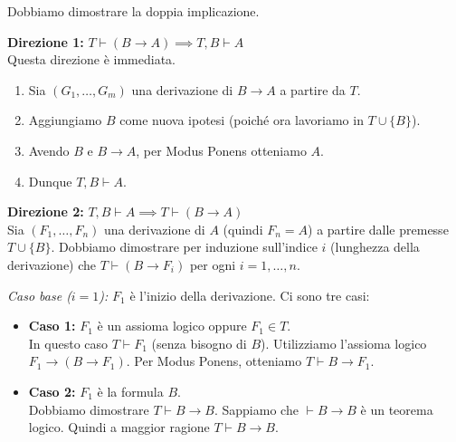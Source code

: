 \documentclass[a4paper,11pt]{report}
\begin{document}
\begin{proofframe}[title=dim]
    Dobbiamo dimostrare la doppia implicazione.

    \textbf{Direzione 1:} \( T \vdash (B \to A) \implies T, B \vdash A \) \\
    Questa direzione è immediata.
    \begin{enumerate}
        \item Sia \( (G_1, \dots, G_m) \) una derivazione di \( B \to A \) a partire da \( T \).
        \item Aggiungiamo \( B \) come nuova ipotesi (poiché ora lavoriamo in \( T \cup \{B\} \)).
        \item Avendo \( B \) e \( B \to A \), per Modus Ponens otteniamo \( A \).
        \item Dunque \( T, B \vdash A \).
    \end{enumerate}

    \textbf{Direzione 2:} \( T, B \vdash A \implies T \vdash (B \to A) \) \\
    Sia \( (F_1, \dots, F_n) \) una derivazione di \( A \) (quindi \( F_n = A \)) a partire dalle premesse \( T \cup \{B\} \).
    Dobbiamo dimostrare per induzione sull'indice \( i \) (lunghezza della derivazione) che \( T \vdash (B \to F_i) \) per ogni \( i = 1, \dots, n \).

    \textit{Caso base (\(i=1\)):} \( F_1 \) è l'inizio della derivazione. Ci sono tre casi:
    \begin{itemize}
        \item \textbf{Caso 1:} \( F_1 \) è un assioma logico oppure \( F_1 \in T \). \\
        In questo caso \( T \vdash F_1 \) (senza bisogno di \( B \)).
        Utilizziamo l'assioma logico \( F_1 \to (B \to F_1) \).
        Per Modus Ponens, otteniamo \( T \vdash B \to F_1 \).

        \item \textbf{Caso 2:} \( F_1 \) è la formula \( B \). \\
        Dobbiamo dimostrare \( T \vdash B \to B \).
        Sappiamo che \( \vdash B \to B \) è un teorema logico.
        Quindi a maggior ragione \( T \vdash B \to B \).
    \end{itemize}


\end{proofframe}
\end{document}
